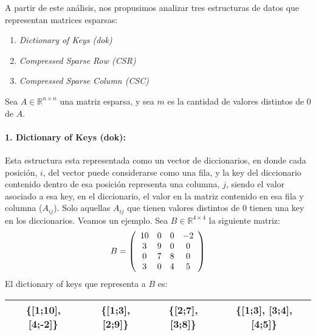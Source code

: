 A partir de este análisis, nos propusimos analizar tres estructuras de datos que representan matrices esparsas:
\begin{enumerate}
  \item \textit{Dictionary of Keys (dok)}
  \item \textit{Compressed Sparse Row (CSR)}
  \item \textit{Compressed Sparse Column (CSC)}
\end{enumerate}

Sea $A \in \mathbb{R}^{n \times n}$ una matriz esparsa, y sea $m$ es la cantidad de valores distintos de 0 de $A$.
\paragraph{1. Dictionary of Keys (dok):}
Esta estructura esta representada como un vector de diccionarios, en donde cada posición, $i$, del vector puede considerarse como una fila, y la key del diccionario contenido dentro de esa posición representa una columna, $j$, siendo el valor asociado a esa key, en el diccionario, el valor en la matriz contenido en esa fila y columna ($A_{ij}$). Solo aquellas $A_{ij}$ que tienen valores distintos de 0 tienen una key en los diccionarios.
\newline
\newline
Veamos un ejemplo. Sea $B \in \mathbb{R}^{4 \times 4}$ la siguiente matriz:
\[
  B = \left(\begin{array}{*5{c}}
    10 & 0 & 0 & -2\\
    3  & 9 & 0 & 0 \\
    0  & 7 & 8 & 0 \\
    3  & 0 & 4 & 5
  \end{array}\right)
\]
El dictionary of keys que representa a $B$ es:

\begin{table}[H]
	\centering
	\begin{tabular}{|c|c|c|c|}
		\hline
        \{[1;10], [4;-2]\} & \{[1;3], [2;9]\} & \{[2;7], [3;8]\} & \{[1;3], [3;4], [4;5]\} \\
        \hline
	\end{tabular}
\end{table}

